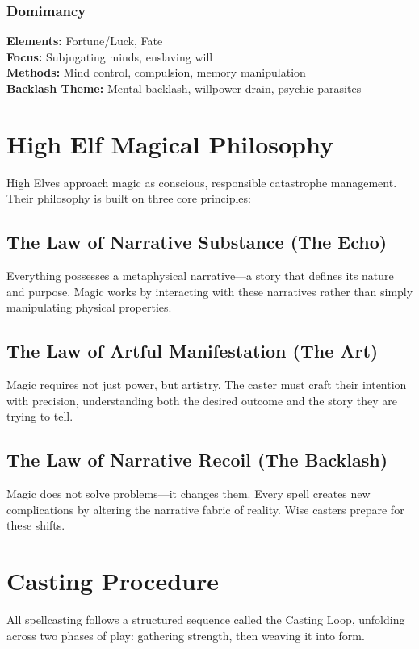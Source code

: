 \documentclass[11pt]{report}
\begin{document}
\subsubsection{Domimancy}
\textbf{Elements:} Fortune/Luck, Fate\\
\textbf{Focus:} Subjugating minds, enslaving will\\
\textbf{Methods:} Mind control, compulsion, memory manipulation\\
\textbf{Backlash Theme:} Mental backlash, willpower drain, psychic parasites

\section{High Elf Magical Philosophy}

High Elves approach magic as conscious, responsible catastrophe management. Their philosophy is built on three core principles:

\subsection{The Law of Narrative Substance (The Echo)}
Everything possesses a metaphysical narrative—a story that defines its nature and purpose. Magic works by interacting with these narratives rather than simply manipulating physical properties.

\subsection{The Law of Artful Manifestation (The Art)}
Magic requires not just power, but artistry. The caster must craft their intention with precision, understanding both the desired outcome and the story they are trying to tell.

\subsection{The Law of Narrative Recoil (The Backlash)}
Magic does not solve problems—it changes them. Every spell creates new complications by altering the narrative fabric of reality. Wise casters prepare for these shifts.

\section{Casting Procedure}

All spellcasting follows a structured sequence called the Casting Loop, unfolding across two phases of play: gathering strength, then weaving it into form.
\end{document}
